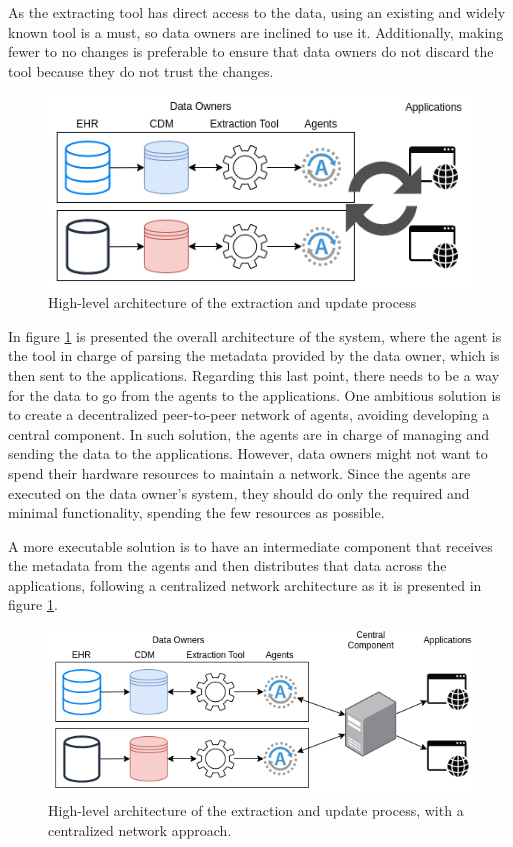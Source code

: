 As the extracting tool has direct access to the data, using an existing and widely known tool is a must, so data owners are inclined to use it.
Additionally, making fewer to no changes is preferable to ensure that data owners do not discard the tool because they do not trust the changes.

\begin{figure}[H]
    \center
    \includegraphics[width=.6\textwidth]{overall-arch-v2}
    \caption{High-level architecture of the extraction and update process}
    \label{fig:overall-arch-v2}
\end{figure}

In figure \ref{fig:overall-arch-v2} is presented the overall architecture of the system, where the agent is the tool in charge of parsing the metadata provided by the data owner, which is then sent to the applications.
Regarding this last point, there needs to be a way for the data to go from the agents to the applications.
One ambitious solution is to create a decentralized peer-to-peer network of agents, avoiding developing a central component.
In such solution, the agents are in charge of managing and sending the data to the applications.
However, data owners might not want to spend their hardware resources to maintain a network.
Since the agents are executed on the data owner's system, they should do only the required and minimal functionality, spending the few resources as possible.

A more executable solution is to have an intermediate component that receives the metadata from the agents and then distributes that data across the applications, following a centralized network architecture as it is presented in figure \ref{fig:overall-arch-v2}.

\begin{figure}[H]
    \center
    \includegraphics[width=.6\textwidth]{overall-arch-v3}
    \caption{High-level architecture of the extraction and update process, with a centralized network approach.}
    \label{fig:overall-arch-v3}
\end{figure}

